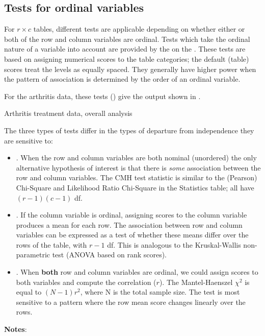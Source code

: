 \subsection{Tests for ordinal variables}\label{sec:ordinaltests}

For \(r \times  c\) tables, different tests are applicable depending
on whether either or both of the row and column variables are
ordinal.  Tests which take the ordinal nature of a variable into
account are provided by the  on the
.
These tests are based on assigning numerical scores to
the table categories;  the default (table) scores treat the levels as
equally spaced.  They generally have higher power when the pattern of
association is determined by the order of an ordinal variable.

For the arthritis data, these tests () give the
output shown in .

\begin{Output}
\caption{Arthritis treatment data, overall analysis}\label{out:arthfreq.2}
\small

\end{Output}

The three types of tests differ in the types of departure from
independence they are sensitive to:

\begin{itemize}
\item {}.  When the row and column
       variables are both nominal (unordered) the only alternative
       hypothesis of interest is that there is \emph{some} association
       between the row and column variables.  The CMH test statistic
       is similar to the (Pearson) Chi-Square and Likelihood Ratio
       Chi-Square in the Statistics table; all have \((r - 1) (c -
       1)\) df.

\item {}.  If the column variable is
       ordinal, assigning scores to the column variable produces a
       mean for each row.  The association between row and column
       variables can be expressed as a test of whether these means
       differ over the rows of the table, with \(r - 1\) df.  This
       is analogous to the Kruskal-Wallis non-parametric test (ANOVA
       based on rank scores).

\item {}.  When {\bf both} row and
       column variables are ordinal, we could assign scores to both
       variables and compute the correlation ($r$).  The Mantel-Haenszel
       \(\chi^2\) is equal to \(( N - 1) r^2\), where N is the total
       sample size.  The test is most sensitive to a pattern where
       the row mean score changes linearly over the rows.
\end{itemize}
{\bf Notes}:

